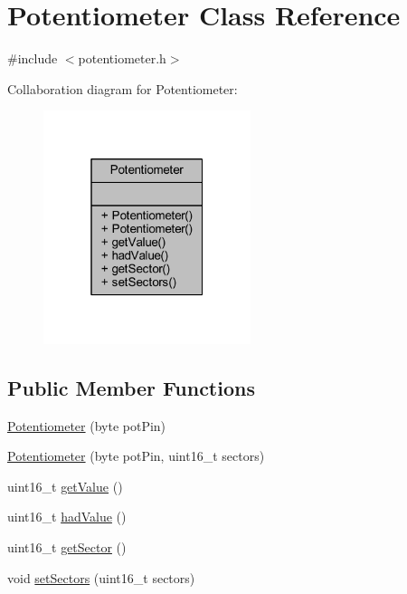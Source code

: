 \hypertarget{class_potentiometer}{}\section{Potentiometer Class Reference}
\label{class_potentiometer}


{\ttfamily \#include $<$potentiometer.\+h$>$}



Collaboration diagram for Potentiometer\+:
\nopagebreak
\begin{figure}[H]
\begin{center}
\leavevmode
\includegraphics[width=172pt]{d1/d70/class_potentiometer__coll__graph}
\end{center}
\end{figure}
\subsection*{Public Member Functions}
\begin{DoxyCompactItemize}
\item 
\hyperlink{class_potentiometer_a15bc5c613ca3c66b54cb816af5935c1b}{Potentiometer} (byte pot\+Pin)
\item 
\hyperlink{class_potentiometer_af91e2477f31efbb3b7ebfedb427007ff}{Potentiometer} (byte pot\+Pin, uint16\+\_\+t sectors)
\item 
uint16\+\_\+t \hyperlink{class_potentiometer_ac992f846228fddede6d86d6ffa1be9b6}{get\+Value} ()
\item 
uint16\+\_\+t \hyperlink{class_potentiometer_ad14725e0c1809d03c7a9f808408ed601}{had\+Value} ()
\item 
uint16\+\_\+t \hyperlink{class_potentiometer_a5dabb56ce200afabd7cdf9cd4d0d3305}{get\+Sector} ()
\item 
void \hyperlink{class_potentiometer_ac7b48ed37eb525ff4f8d21899c0a7053}{set\+Sectors} (uint16\+\_\+t sectors)
\end{DoxyCompactItemize}


